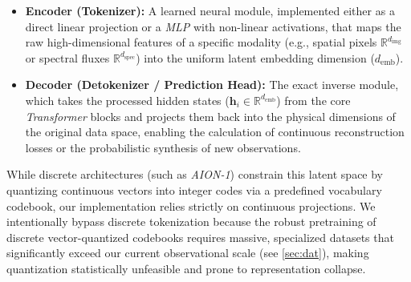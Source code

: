 \begin{itemize}
	\item \textbf{Encoder (Tokenizer):} A learned neural module, implemented either as a direct linear projection or a \textit{\gls{MLP}} with non-linear activations, that maps the raw high-dimensional features of a specific modality (e.g., spatial pixels $\mathbb{R}^{d_{\text{img}}}$ or spectral fluxes $\mathbb{R}^{d_{\text{spec}}}$) into the uniform latent embedding dimension ($d_{\text{emb}}$).
	
	\item \textbf{Decoder (Detokenizer / Prediction Head):} The exact inverse module, which takes the processed hidden states ($\mathbf{h}_i \in \mathbb{R}^{d_{\text{emb}}}$) from the core \textit{Transformer} blocks and projects them back into the physical dimensions of the original data space, enabling the calculation of continuous reconstruction losses or the probabilistic synthesis of new observations.
\end{itemize}

While discrete architectures (such as \textit{AION-1}) constrain this latent space by quantizing continuous vectors into integer codes via a predefined vocabulary codebook, our implementation relies strictly on continuous projections. We intentionally bypass discrete tokenization because the robust pretraining of discrete vector-quantized codebooks requires massive, specialized datasets that significantly exceed our current observational scale (see \cref{sec:dat}), making quantization statistically unfeasible and prone to representation collapse.

